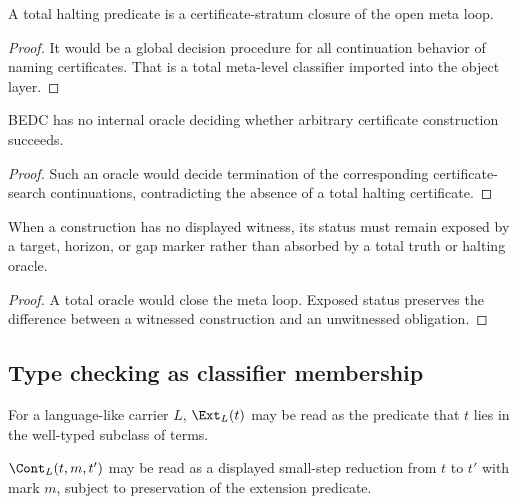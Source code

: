 \begin{theorem}
\label{thm:philosophy-total-halting-closes-meta-loop}
A total halting predicate is a certificate-stratum closure of the open
meta loop.
\end{theorem}
\begin{proof}
It would be a global decision procedure for all continuation behavior
of naming certificates. That is a total meta-level classifier imported
into the object layer.
\end{proof}

\begin{corollary}
\label{cor:philosophy-no-total-proof-search-oracle}
BEDC has no internal oracle deciding whether arbitrary certificate
construction succeeds.
\end{corollary}
\begin{proof}
Such an oracle would decide termination of the corresponding
certificate-search continuations, contradicting the absence of a total
halting certificate.
\end{proof}

\begin{corollary}
\label{cor:philosophy-open-targets-exposed-status}
When a construction has no displayed witness, its status must remain
exposed by a target, horizon, or gap marker rather than absorbed by a
total truth or halting oracle.
\end{corollary}
\begin{proof}
A total oracle would close the meta loop. Exposed status preserves the
difference between a witnessed construction and an unwitnessed
obligation.
\end{proof}

\subsection{Type checking as classifier membership}
\label{subsec:philosophy-type-checking-classifier-membership}

\begin{definition}
\label{def:philosophy-extension-type-membership}
For a language-like carrier \(L\), \(\Ext_{L}(t)\) may be read as the
predicate that \(t\) lies in the well-typed subclass of terms.
\end{definition}

\begin{definition}
\label{def:philosophy-continuation-typed-reduction}
\(\Cont_{L}(t,m,t')\) may be read as a displayed small-step reduction
from \(t\) to \(t'\) with mark \(m\), subject to preservation of the
extension predicate.
\end{definition}

